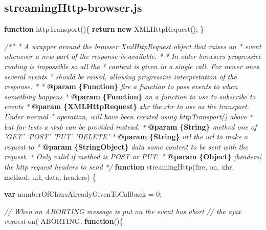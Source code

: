 \documentclass[]{article}
\newenvironment{Shaded}{}{}
\newcommand{\KeywordTok}[1]{\textcolor[rgb]{0.00,0.44,0.13}{\textbf{{#1}}}}
\newcommand{\DecValTok}[1]{\textcolor[rgb]{0.25,0.63,0.44}{{#1}}}
\newcommand{\CommentTok}[1]{\textcolor[rgb]{0.38,0.63,0.69}{\textit{{#1}}}}
\newcommand{\FunctionTok}[1]{\textcolor[rgb]{0.02,0.16,0.49}{{#1}}}
\newcommand{\NormalTok}[1]{{#1}}
\begin{document}
\pagebreak

\subsection{streamingHttp-browser.js}

\begin{Shaded}
\begin{Highlighting}[]
\KeywordTok{function} \FunctionTok{httpTransport}\NormalTok{()\{}
   \KeywordTok{return} \KeywordTok{new} \FunctionTok{XMLHttpRequest}\NormalTok{();}
\NormalTok{\}}

\CommentTok{/**}
\CommentTok{ * A wrapper around the browser XmlHttpRequest object that raises an }
\CommentTok{ * event whenever a new part of the response is available.}
\CommentTok{ * }
\CommentTok{ * In older browsers progressive reading is impossible so all the }
\CommentTok{ * content is given in a single call. For newer ones several events}
\CommentTok{ * should be raised, allowing progressive interpretation of the response.}
\CommentTok{ *      }
\CommentTok{ * }\KeywordTok{@param}\CommentTok{ }\KeywordTok{\{Function\}}\CommentTok{ fire a function to pass events to when something happens}
\CommentTok{ * }\KeywordTok{@param}\CommentTok{ }\KeywordTok{\{Function\}}\CommentTok{ on a function to use to subscribe to events}
\CommentTok{ * }\KeywordTok{@param}\CommentTok{ }\KeywordTok{\{XMLHttpRequest\}}\CommentTok{ xhr the xhr to use as the transport. Under normal}
\CommentTok{ *          operation, will have been created using httpTransport() above}
\CommentTok{ *          but for tests a stub can be provided instead.}
\CommentTok{ * }\KeywordTok{@param}\CommentTok{ }\KeywordTok{\{String\}}\CommentTok{ method one of 'GET' 'POST' 'PUT' 'DELETE'}
\CommentTok{ * }\KeywordTok{@param}\CommentTok{ }\KeywordTok{\{String\}}\CommentTok{ url the url to make a request to}
\CommentTok{ * }\KeywordTok{@param}\CommentTok{ }\KeywordTok{\{String\textbar{}Object\}}\CommentTok{ data some content to be sent with the request.}
\CommentTok{ *                        Only valid if method is POST or PUT.}
\CommentTok{ * }\KeywordTok{@param}\CommentTok{ }\KeywordTok{\{Object\}}\CommentTok{ [headers] the http request headers to send                       }
\CommentTok{ */}  
\KeywordTok{function} \FunctionTok{streamingHttp}\NormalTok{(fire, on, xhr, method, url, data, headers) \{}
        
   \KeywordTok{var} \NormalTok{numberOfCharsAlreadyGivenToCallback = }\DecValTok{0}\NormalTok{;}

   \CommentTok{// When an ABORTING message is put on the event bus abort }
   \CommentTok{// the ajax request         }
   \FunctionTok{on}\NormalTok{( ABORTING, }\KeywordTok{function}\NormalTok{()\{}
  

\end{Highlighting}
\end{Shaded}
\end{document}
